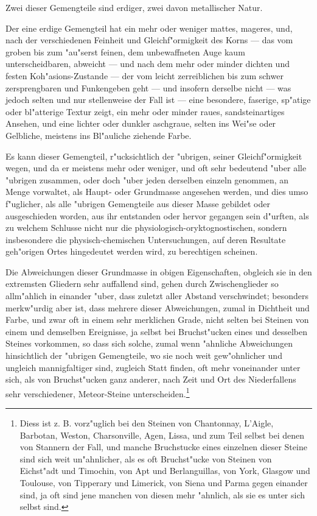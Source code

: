 \documentclass[a4paper, 11pt, oneside, german]{article}
\begin{document}
Zwei dieser Gemengteile sind erdiger, zwei davon metallischer Natur.

Der eine erdige Gemengteil hat ein mehr oder weniger mattes, mageres, und, nach der verschiedenen Feinheit und Gleichf"ormigkeit des Korns --- das vom groben bis zum "au"serst feinen, dem unbewaffneten Auge kaum unterscheidbaren, abweicht --- und nach dem mehr oder minder dichten und festen Koh"asions-Zustande --- der vom leicht zerreiblichen bis zum schwer zersprengbaren und Funkengeben geht --- und insofern derselbe nicht --- was jedoch selten und nur stellenweise der Fall ist --- eine besondere, faserige, sp"atige oder bl"atterige Textur zeigt, ein mehr oder minder raues, sandsteinartiges Ansehen, und eine lichter oder dunkler aschgraue, selten ins Wei"se oder Gelbliche, meistens ins Bl"auliche ziehende Farbe.

Es kann dieser Gemengteil, r"ucksichtlich der "ubrigen, seiner Gleichf"ormigkeit wegen, und da er meistens mehr oder weniger, und oft sehr bedeutend "uber alle "ubrigen zusammen, oder doch "uber jeden derselben einzeln genommen, an Menge vorwaltet, als Haupt- oder Grundmasse angesehen werden, und dies umso f"uglicher, als alle "ubrigen Gemengteile aus dieser Masse gebildet oder ausgeschieden worden, aus ihr entstanden oder hervor gegangen sein d"urften, als zu welchem Schlusse nicht nur die physiologisch-oryktognostischen, sondern insbesondere die physisch-chemischen Untersuchungen, auf deren Resultate geh"origen Ortes hingedeutet werden wird, zu berechtigen scheinen.

Die Abweichungen dieser Grundmasse in obigen Eigenschaften, obgleich sie in den extremsten Gliedern sehr auffallend sind, gehen durch Zwischenglieder so allm"ahlich in einander "uber, dass zuletzt aller Abstand verschwindet; besonders merkw"urdig aber ist, dass mehrere dieser Abweichungen, zumal in Dichtheit und Farbe, und zwar oft in einem sehr merklichen Grade, nicht selten bei Steinen von einem und demselben Ereignisse, ja selbst bei Bruchst"ucken eines und desselben Steines vorkommen, so dass sich solche, zumal wenn "ahnliche Abweichungen hinsichtlich der "ubrigen Gemengteile, wo sie noch weit gew"ohnlicher und ungleich mannigfaltiger sind, zugleich Statt finden, oft mehr voneinander unter sich, als von Bruchst"ucken ganz anderer, nach Zeit und Ort des Niederfallens sehr verschiedener, Meteor-Steine unterscheiden.\footnote{Diess ist z. B. vorz"uglich bei den Steinen von Chantonnay, L'Aigle, Barbotan, Weston, Charsonville, Agen, Lissa, und zum Teil selbst bei denen von Stannern der Fall, und manche Bruchstucke eines einzelnen dieser Steine sind sich weit un"ahnlicher, als es oft Bruchst"ucke von Steinen von Eichst"adt und Timochin, von Apt und Berlanguillas, von York, Glasgow und Toulouse, von Tipperary und Limerick, von Siena und Parma gegen einander sind, ja oft sind jene manchen von diesen mehr "ahnlich, als sie es unter sich selbst sind.}
\end{document}
